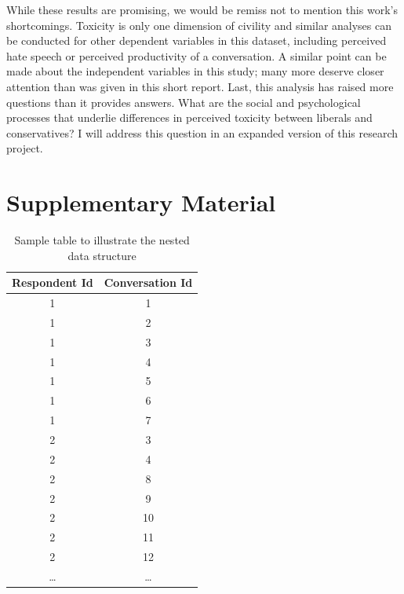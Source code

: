 \documentclass{article}
\begin{document}
While these results are promising, we would be remiss not to mention this work's shortcomings. Toxicity is only one dimension of civility and similar analyses can be conducted for other dependent variables in this dataset, including perceived hate speech or perceived productivity of a conversation. A similar point can be made about the independent variables in this study; many more deserve closer attention than was given in this short report. Last, this analysis has raised more questions than it provides answers. What are the social and psychological processes that underlie differences in perceived toxicity between liberals and conservatives? I will address this question in an expanded version of this research project. 

\newpage



\clearpage
\section{Supplementary Material}

\begin{table}[htbp]
    \centering
    \begin{tabular}{|c|c|}
    \hline
    \textbf{Respondent Id} & \textbf{Conversation Id} \\
    \hline
    1 & 1 \\
    1 & 2 \\
    1 & 3 \\
    1 & 4 \\
    1 & 5 \\
    1 & 6 \\
    1 & 7 \\
    \midrule
    2 & 3 \\
    2 & 4 \\
    2 & 8 \\
    2 & 9 \\
    2 & 10 \\
    2 & 11 \\
    2 & 12 \\
    \dots & \dots \\
    \hline
    \end{tabular}
    \caption{Sample table to illustrate the nested data structure}
    \label{sample-table}
\end{table}

\clearpage
\end{document}
